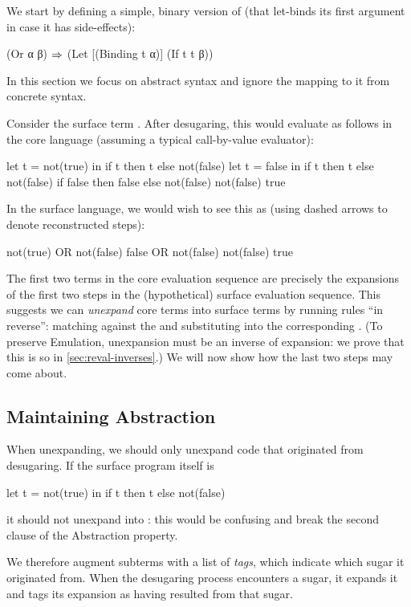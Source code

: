 We start by defining a simple, binary version of  (that
let-binds its first argument in case it has side-effects):
\begin{Codes}
(Or α β) \(\Rightarrow\) (Let [(Binding t α)]
                 (If t t β))
\end{Codes}
In this section we focus on abstract syntax and ignore
the mapping to it from concrete syntax.

Consider the surface term . After
desugaring, this would evaluate as follows in the core language
(assuming a typical call-by-value evaluator):
\begin{Codes}
    let t = not(true) in
      if t then t else not(false)
\CoreStep let t = false in
      if t then t else not(false)
\CoreStep if false then false else not(false)
\CoreStep not(false)
\CoreStep true
\end{Codes}
In the surface language, we would wish to see this as (using dashed
arrows to denote reconstructed steps):
\begin{Codes}
    not(true) OR not(false)
\SurfStep false OR not(false)
\SurfStep not(false)
\SurfStep true
\end{Codes}
The first two terms in the core evaluation sequence are precisely the
expansions of the first two steps in the (hypothetical) surface evaluation
sequence. This suggests
we can \emph{unexpand} core terms into surface terms by running rules ``in
reverse'': matching against the  and substituting into the
corresponding .
(To preserve Emulation, unexpansion must be an inverse of expansion: we
prove that this is so in \cref{sec:reval-inverses}.)
We will now show how the last two steps
may come about.

\subsection{Maintaining Abstraction}
\label{sec:reval-exposition-tagging}

When unexpanding, we should only unexpand code that
originated from desugaring. If the surface program itself is
\begin{Codes}
let t = not(true) in
  if t then t else not(false)
\end{Codes}
it should not unexpand into :
this would be confusing and break the second clause of the Abstraction property.

We therefore augment subterms with a list of \emph{tags}, which
indicate which sugar it originated from.
When the desugaring process encounters a sugar, it expands it and
tags its expansion as having resulted from that sugar.

